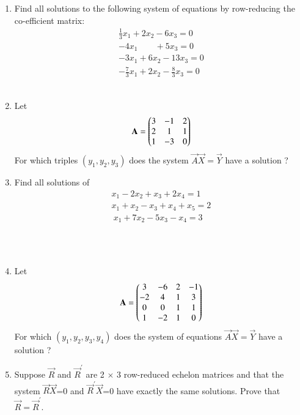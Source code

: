 \renewcommand{\theequation}{\theenumi}
\renewcommand{\thefigure}{\theenumi}
\begin{enumerate}[label=\thesubsection.\arabic*.,ref=\thesubsection.\theenumi]
%
\item Find all solutions to the following system of equations by row-reducing the co-efficient matrix:
\begin{align}
\frac{1}{3}x_1 +2x_2 - 6x_3 =0\\
-4x_1\quad \quad+ 5x_3=0\\
-3x_1+6x_2-13x_3=0\\
-\frac{7}{3}x_1 +2x_2 - \frac{8}{3}x_3 =0
\end{align}
\\
\solution

%
\item Let
\begin{align}
    \mathbf{A}=\begin{pmatrix}3 & -1 & 2\\2 & 1 & 1\\1 & -3 & 0\end{pmatrix} 
\end{align}
For which triples $(y_1,y_2,y_3)$ does the system $\vec{A}\vec{X}=\vec{Y}$ have a solution ? 
%
\item Find all solutions of
 \begin{align}
 x_1-2x_2+x_3+2x_4=1 \nonumber\\
 x_1+x_2-x_3+x_4+x_5=2\nonumber\\\
 x_1+7x_2-5x_3-x_4=3\nonumber\
 \end{align}
%
\\
\solution

%
\\
\solution

\item Let
\begin{align}
    \mathbf{A}=\begin{pmatrix}3 & -6 & 2 & -1\\-2 & 4 & 1 & 3\\0 & 0 & 1& 1\\1 & -2 & 1 & 0\end{pmatrix} 
\end{align}
For which $(y_1,y_2,y_3,y_4)$ does the system of equations $\vec{A}\vec{X}=\vec{Y}$ have a solution ? 
%
\solution

%
%
\item Suppose $\vec{R}$ and $\vec{R}^{'}$ are 2 $\times$ 3 row-reduced echelon matrices and that the system $\vec{R}$$\vec{X}$=0 and $\vec{R}^{'}\vec{X}$=0 have exactly the same solutions. Prove 
that $\vec{R}=\vec{R}^{'}$.

\solution

\end{enumerate}


